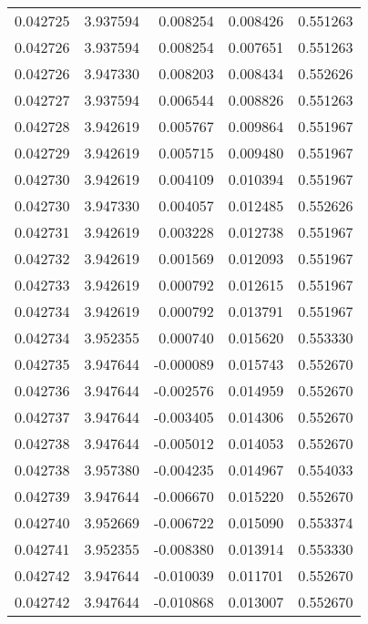 \begin{tabular}{lrrrr}
0.042725    &  3.937594 &  0.008254 &  0.008426 &             0.551263 \\
0.042726    &  3.937594 &  0.008254 &  0.007651 &             0.551263 \\
0.042726    &  3.947330 &  0.008203 &  0.008434 &             0.552626 \\
0.042727    &  3.937594 &  0.006544 &  0.008826 &             0.551263 \\
0.042728    &  3.942619 &  0.005767 &  0.009864 &             0.551967 \\
0.042729    &  3.942619 &  0.005715 &  0.009480 &             0.551967 \\
0.042730    &  3.942619 &  0.004109 &  0.010394 &             0.551967 \\
0.042730    &  3.947330 &  0.004057 &  0.012485 &             0.552626 \\
0.042731    &  3.942619 &  0.003228 &  0.012738 &             0.551967 \\
0.042732    &  3.942619 &  0.001569 &  0.012093 &             0.551967 \\
0.042733    &  3.942619 &  0.000792 &  0.012615 &             0.551967 \\
0.042734    &  3.942619 &  0.000792 &  0.013791 &             0.551967 \\
0.042734    &  3.952355 &  0.000740 &  0.015620 &             0.553330 \\
0.042735    &  3.947644 & -0.000089 &  0.015743 &             0.552670 \\
0.042736    &  3.947644 & -0.002576 &  0.014959 &             0.552670 \\
0.042737    &  3.947644 & -0.003405 &  0.014306 &             0.552670 \\
0.042738    &  3.947644 & -0.005012 &  0.014053 &             0.552670 \\
0.042738    &  3.957380 & -0.004235 &  0.014967 &             0.554033 \\
0.042739    &  3.947644 & -0.006670 &  0.015220 &             0.552670 \\
0.042740    &  3.952669 & -0.006722 &  0.015090 &             0.553374 \\
0.042741    &  3.952355 & -0.008380 &  0.013914 &             0.553330 \\
0.042742    &  3.947644 & -0.010039 &  0.011701 &             0.552670 \\
0.042742    &  3.947644 & -0.010868 &  0.013007 &             0.552670 \\

\end{tabular}
